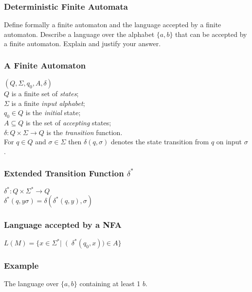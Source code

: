 

\begin{frame}
    \frametitle{Deterministic Finite Automata}
    Define formally a finite automaton and the language accepted by a finite
    automaton. Describe a language over the alphabet $\{a, b\}$ that can be
    accepted by a finite automaton. Explain and justify your answer.
\end{frame}

\begin{frame}
    \frametitle{A Finite Automaton}
    $(Q,\Sigma,q_0, A,\delta)$\\
    $Q$ is a finite set of \emph{states};\\
    $\Sigma$ is a finite \emph{input alphabet};\\
    $q_0 \in Q$ is the \emph{initial} state;\\
    $A \subseteq Q$ is the set of \emph{accepting} states;\\
    $\delta : Q \times \Sigma \rightarrow Q$ is the \emph{transition}
    function.\\
    For $q \in Q$ and $\sigma \in \Sigma$ then $\delta(q, \sigma)$ denotes the
    state transition from $q$ on input $\sigma$.
\end{frame}

\begin{frame}
    \frametitle{Extended Transition Function $\delta^\ast$}
    $\delta^\ast : Q \times \Sigma^\ast \rightarrow Q$\\
    $\delta^\ast (q, y\sigma) = \delta(\delta^\ast (q, y), \sigma)$
\end{frame}

\begin{frame}
    \frametitle{Language accepted by a NFA}
    $L(M) = \{x \in \Sigma^\ast \left|\right (\delta^\ast (q_0, x)) \in A\}$
\end{frame}

\begin{frame}
    \frametitle{Example}
    The language over $\{a,b\}$ containing at least 1 $b$.

\end{frame}

